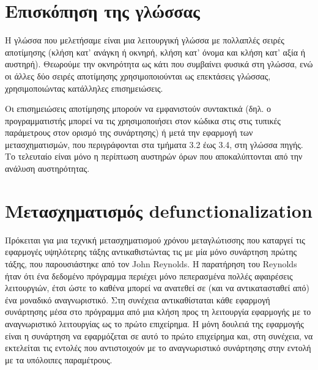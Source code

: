 \documentclass[diploma]{softlab-thesis}
\begin{document}
\section{Επισκόπηση της γλώσσας}

Η γλώσσα που μελετήσαμε είναι μια λειτουργική γλώσσα
με πολλαπλές σειρές αποτίμησης (κλήση κατ' ανάγκη ή
οκνηρή, κλήση κατ' όνομα και κλήση κατ' αξία ή αυστηρή).
Θεωρούμε την οκνηρότητα ως κάτι που συμβαίνει φυσικά στη γλώσσα, ενώ
οι άλλες δύο σειρές αποτίμησης χρησιμοποιούνται ως επεκτάσεις γλώσσας,
χρησιμοποιώντας κατάλληλες επισημειώσεις.

Οι επισημειώσεις αποτίμησης μπορούν να εμφανιστούν συντακτικά (δηλ. 
ο προγραμματιστής μπορεί να τις χρησιμοποιήσει στον κώδικα στις
στις τυπικές παράμετρους στον ορισμό της συνάρτησης) ή
μετά την εφαρμογή των μετασχηματισμών, που περιγράφονται στα τμήματα 3.2 έως 3.4,
στη γλώσσα πηγής. Το τελευταίο
είναι μόνο η περίπτωση αυστηρών όρων που αποκαλύπτονται από την ανάλυση αυστηρότητας.

\section{Μετασχηματισμός defunctionalization}

Πρόκειται για μια τεχνική μετασχηματισμού χρόνου μεταγλώτισσης που καταργεί τις εφαρμογές 
υψηλότερης τάξης
αντικαθιστώντας τις με μία μόνο συνάρτηση πρώτης τάξης, που παρουσιάστηκε από τον 
John Reynolds.
Η παρατήρηση του Reynolds ήταν ότι ένα δεδομένο πρόγραμμα περιέχει μόνο πεπερασμένα 
πολλές αφαιρέσεις λειτουργιών, έτσι ώστε το καθένα μπορεί
να ανατεθεί σε (και να αντικατασταθεί από) ένα μοναδικό αναγνωριστικό. Στη συνέχεια 
αντικαθίσταται κάθε εφαρμογή συνάρτησης μέσα στο πρόγραμμα
από μια κλήση προς τη λειτουργία εφαρμογής με το αναγνωριστικό λειτουργίας 
ως το πρώτο επιχείρημα. Η μόνη δουλειά της εφαρμογής είναι η συνάρτηση
να εφαρμόζεται σε αυτό το πρώτο επιχείρημα και, στη συνέχεια, να εκτελείται
τις εντολές που αντιστοιχούν με το αναγνωριστικό συνάρτησης στην εντολή με τα 
υπόλοιπες παραμέτρους.

\end{document}

